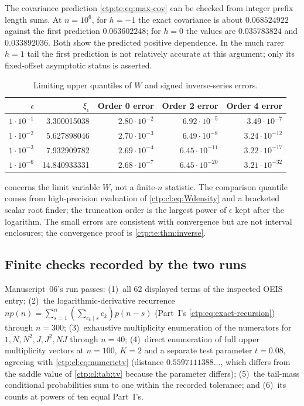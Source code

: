\documentclass[11pt,a4paper]{article}
\numberwithin{equation}{section}
\theoremstyle{definition}
\theoremstyle{remark}
\begin{document}
The covariance prediction \eqref{ctp:te:eq:max-cov} can be checked from
integer prefix length sums. At $n=10^6$, for $h=-1$ the exact covariance is
about $0.068524922$ against the first prediction $0.063602248$; for $h=0$ the
values are $0.035783824$ and $0.033892036$. Both show the predicted positive
dependence. In the much rarer $h=1$ tail the first prediction is not
relatively accurate at this argument; only its fixed-offset asymptotic status
is asserted.

\begin{table}[htbp]
\centering\small
\caption{Limiting upper quantiles of $W$ and signed inverse-series errors.}
\label{ctp:te:tab:quantile}
\begin{tabular}{rrrrr}
\toprule
$\epsilon$ & $\xi_\epsilon$ & Order 0 error & Order 2 error & Order 4 error\\
\midrule
$1\cdot10^{-1}$ & 3.300015038 & $2.80\cdot10^{-2}$ & $6.92\cdot10^{-5}$ & $3.49\cdot10^{-7}$\\
$1\cdot10^{-2}$ & 5.627898046 & $2.70\cdot10^{-3}$ & $6.49\cdot10^{-8}$ & $3.24\cdot10^{-12}$\\
$1\cdot10^{-3}$ & 7.932909782 & $2.69\cdot10^{-4}$ & $6.45\cdot10^{-11}$ & $3.22\cdot10^{-17}$\\
$1\cdot10^{-6}$ & 14.840933331 & $2.68\cdot10^{-7}$ & $6.45\cdot10^{-20}$ & $3.21\cdot10^{-32}$\\
\bottomrule
\end{tabular}
\end{table}

 concerns the limit variable $W$, not a finite-$n$
statistic. The comparison quantile comes from high-precision evaluation of
\eqref{ctp:cl:eq:Wdensity} and a bracketed scalar root finder; the truncation
order is the largest power of $\epsilon$ kept after the logarithm. The small
errors are consistent with convergence but are not interval enclosures; the
convergence proof is \cref{ctp:te:thm:inverse}.

\subsection{Finite checks recorded by the two runs}
Manuscript~06's run passes: (1)~all 62 displayed terms of the inspected OEIS
entry; (2)~the logarithmic-derivative recurrence
$np(n)=\sum_{s=1}^n(\sum_{c_k\mid s}c_k)p(n-s)$ (Part~I's
\eqref{ctp:eq:exact-recursion}) through $n=300$; (3)~exhaustive multiplicity
enumeration of the numerators for $1,N,N^2,J,J^2,NJ$ through $n=40$;
(4)~direct enumeration of full upper multiplicity vectors at $n=100$, $K=2$
and a separate test parameter $t=0.08$, agreeing with
\eqref{ctp:cl:eq:numerictv} (distance $0.5597111388\ldots$, which differs from
the saddle value of \cref{ctp:cl:tab:tv} because the parameter differs);
(5)~the tail-mass conditional probabilities sum to one within the recorded
tolerance; and (6)~its counts at powers of ten equal Part~I's.
\end{document}
